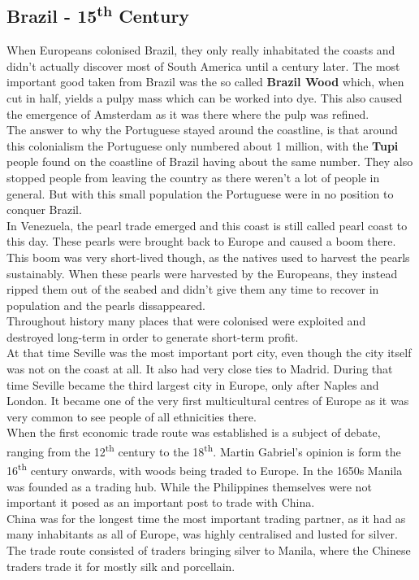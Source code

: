 \documentclass{article}
\begin{document}
	\subsection{Brazil - 15\textsuperscript{th} Century}
	When Europeans colonised Brazil, they only really inhabitated the coasts and didn't actually discover most of South America until a century later. The most important good taken from Brazil was the so called \textbf{Brazil Wood} which, when cut in half, yields a pulpy mass which can be worked into dye. This also caused the emergence of Amsterdam as it was there where the pulp was refined. \\
	The answer to why the Portuguese stayed around the coastline, is that around this colonialism the Portuguese only numbered about 1 million, with the \textbf{Tupi} people found on the coastline of Brazil having about the same number. They also stopped people from leaving the country as there weren't a lot of people in general. But with this small population the Portuguese were in no position to conquer Brazil. \\
	In Venezuela, the pearl trade emerged and this coast is still called pearl coast to this day. These pearls were brought back to Europe and caused a boom there. This boom was very short-lived though, as the natives used to harvest the pearls sustainably. When these pearls were harvested by the Europeans, they instead ripped them out of the seabed and didn't give them any time to recover in population and the pearls dissappeared. \\
	Throughout history many places that were colonised were exploited and destroyed long-term in order to generate short-term profit. \\
	At that time Seville was the most important port city, even though the city itself was not on the coast at all. It also had very close ties to Madrid. During that time Seville became the third largest city in Europe, only after Naples and London. It became one of the very first multicultural centres of Europe as it was very common to see people of all ethnicities there. \\
	When the first economic trade route was established is a subject of debate, ranging from the 12\textsuperscript{th} century to the 18\textsuperscript{th}. Martin Gabriel's opinion is form the 16\textsuperscript{th} century onwards, with woods being traded to Europe. In the 1650s Manila was founded as a trading hub. While the Philippines themselves were not important it posed as an important post to trade with China. \\
	China was for the longest time the most important trading partner, as it had as many inhabitants as all of Europe, was highly centralised and lusted for silver. \\
	The trade route consisted of traders bringing silver to Manila, where the Chinese traders trade it for mostly silk and porcellain. \\
\end{document}
